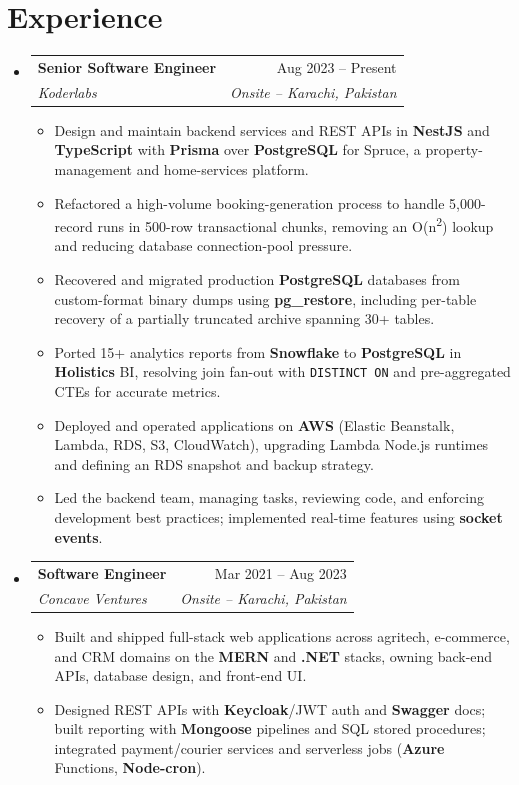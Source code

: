 \documentclass[a4paper,11pt]{article}
\makeatletter
\newcommand{\resumeItem}[1]{\item\small{#1}}
\newcommand{\resumeItemListStart}{\begin{itemize}[leftmargin=0.2in, rightmargin=0.11in, itemsep=1pt, topsep=2pt, parsep=0pt]}
\newcommand{\resumeItemListEnd}{\end{itemize}}
\newcommand{\resumeQuadHeading}[4]{
  \item
  \begin{tabular*}{0.96\textwidth}[t]{l@{\extracolsep{\fill}}r}
    \textbf{#1} & #2 \\
    \textit{\small#3} & \textit{\small #4} \\
  \end{tabular*}\vspace{-4pt}
}
\newcommand{\resumeHeadingListStart}{\begin{itemize}[leftmargin=0in, label={}, topsep=2pt, itemsep=0pt]}
\newcommand{\resumeHeadingListEnd}{\end{itemize}}
\makeatother
\begin{document}
\section{Experience}
\resumeHeadingListStart{}
  \resumeQuadHeading{Senior Software Engineer}{Aug 2023 -- Present}
  {Koderlabs}{Onsite -- Karachi, Pakistan}
  \resumeItemListStart{}
    \resumeItem{Design and maintain backend services and REST APIs in \textbf{NestJS} and \textbf{TypeScript} with \textbf{Prisma} over \textbf{PostgreSQL} for Spruce, a property-management and home-services platform.}
    \resumeItem{Refactored a high-volume booking-generation process to handle 5,000-record runs in 500-row transactional chunks, removing an O(n\textsuperscript{2}) lookup and reducing database connection-pool pressure.}
    \resumeItem{Recovered and migrated production \textbf{PostgreSQL} databases from custom-format binary dumps using \textbf{pg\_restore}, including per-table recovery of a partially truncated archive spanning 30+ tables.}
    \resumeItem{Ported 15+ analytics reports from \textbf{Snowflake} to \textbf{PostgreSQL} in \textbf{Holistics} BI, resolving join fan-out with \texttt{DISTINCT ON} and pre-aggregated CTEs for accurate metrics.}
    \resumeItem{Deployed and operated applications on \textbf{AWS} (Elastic Beanstalk, Lambda, RDS, S3, CloudWatch), upgrading Lambda Node.js runtimes and defining an RDS snapshot and backup strategy.}
    \resumeItem{Led the backend team, managing tasks, reviewing code, and enforcing development best practices; implemented real-time features using \textbf{socket events}.}
  \resumeItemListEnd{}

  \resumeQuadHeading{Software Engineer}{Mar 2021 -- Aug 2023}
  {Concave Ventures}{Onsite -- Karachi, Pakistan}
  \resumeItemListStart{}
    \resumeItem{Built and shipped full-stack web applications across agritech, e-commerce, and CRM domains on the \textbf{MERN} and \textbf{.NET} stacks, owning back-end APIs, database design, and front-end UI.}
    \resumeItem{Designed REST APIs with \textbf{Keycloak}/JWT auth and \textbf{Swagger} docs; built reporting with \textbf{Mongoose} pipelines and SQL stored procedures; integrated payment/courier services and serverless jobs (\textbf{Azure} Functions, \textbf{Node-cron}).}
  \resumeItemListEnd{}
\resumeHeadingListEnd{}

\end{document}
